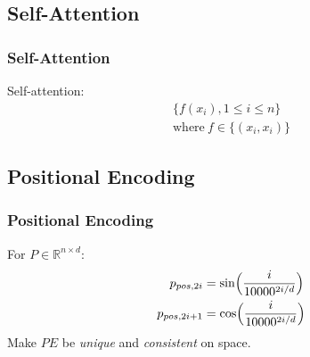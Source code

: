 \documentclass[]{beamer}
\newcommand{\bb}[1]{\mathbb{#1}}
\newcommand{\x}{\times}
\begin{document}
\subsection{Self-Attention}
\begin{frame}
    \frametitle{Self-Attention}
    Self-attention: 
    \begin{align*}
        \{f(x_i), 1 \le i \le n\}  \\
        \text{where}~f \in \{(x_i, x_i)\}
    \end{align*}

\end{frame}

\subsection{Positional Encoding}
\begin{frame}
    \frametitle{Positional Encoding}
    For $P \in \bb{R}^{n\x d}$:
    \begin{align*}
        p_{pos,2i} &= \sin \Bigl(\frac{i}{10000^{2i/d}}\Bigr) \\
        p_{pos,2i+1} &= \cos \Bigl(\frac{i}{10000^{2i/d}}\Bigr)
    \end{align*}
    Make $PE$ be \emph{unique} and \emph{consistent} on space.
\end{frame}
\end{document}
